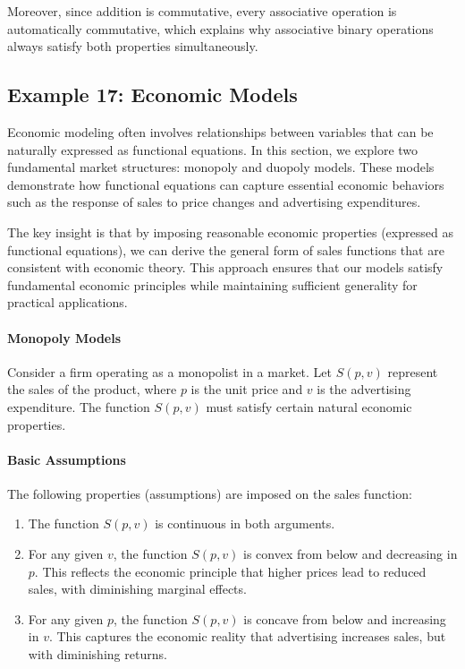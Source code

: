 Moreover, since addition is commutative, every associative operation is automatically commutative, which explains why associative binary operations always satisfy both properties simultaneously.

\subsection{Example 17: Economic Models}
Economic modeling often involves relationships between variables that can be naturally expressed as functional equations. In this section, we explore two fundamental market structures: monopoly and duopoly models. These models demonstrate how functional equations can capture essential economic behaviors such as the response of sales to price changes and advertising expenditures.

The key insight is that by imposing reasonable economic properties (expressed as functional equations), we can derive the general form of sales functions that are consistent with economic theory. This approach ensures that our models satisfy fundamental economic principles while maintaining sufficient generality for practical applications.

\paragraph{Monopoly Models}
Consider a firm operating as a monopolist in a market. Let $S(p,v)$ represent the sales of the product, where $p$ is the unit price and $v$ is the advertising expenditure. The function $S(p,v)$ must satisfy certain natural economic properties.

\paragraph{Basic Assumptions}
The following properties (assumptions) are imposed on the sales function:
\begin{enumerate}
\item The function $S(p,v)$ is continuous in both arguments.
\item For any given $v$, the function $S(p,v)$ is convex from below and decreasing in $p$. This reflects the economic principle that higher prices lead to reduced sales, with diminishing marginal effects.
\item For any given $p$, the function $S(p,v)$ is concave from below and increasing in $v$. This captures the economic reality that advertising increases sales, but with diminishing returns.
\end{enumerate}

